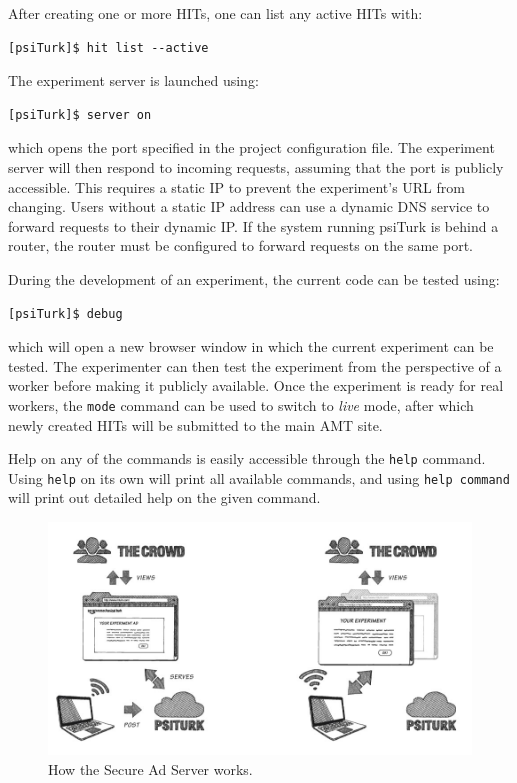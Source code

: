 \documentclass[twocolumn]{svjour3}          %
\newcommand{\psiturk}[0]{\textsf{psiTurk}}
\begin{document}
After creating one or more HITs, one can list any active HITs with:

\begin{lstlisting}
[psiTurk]$ hit list --active
\end{lstlisting}

The experiment server is launched using:

\begin{lstlisting}
[psiTurk]$ server on
\end{lstlisting}

\noindent which opens the port specified in the project configuration file.
The experiment server will then respond to incoming requests, assuming that the port is publicly accessible.
This requires a static IP to prevent the experiment's URL from changing.
Users without a static IP address can use a dynamic DNS service to forward requests to their dynamic IP.
If the system running \psiturk{} is behind a router, the router must be configured to forward requests on the same port.

During the development of an experiment, the current code can be tested using:

\begin{lstlisting}
[psiTurk]$ debug
\end{lstlisting}

\noindent which will open a new browser window in which the current experiment can be tested. The experimenter can then test the experiment from the perspective of a worker before making it publicly available.
Once the experiment is ready for real workers, the \texttt{mode} command can be used to switch to \emph{live} mode, after which newly created HITs will be submitted to the main AMT site.

Help on any of the commands is easily accessible through the \texttt{help} command. Using \texttt{help} on its own will print all available commands, and using \texttt{help command} will print out detailed help on the given command.

\begin{figure}[tp]
\centering
\includegraphics[scale=.40]{figures/psiturk_cloud_sequence.jpg}
\caption{How the Secure Ad Server works.}
\label{fig:adserver}
\end{figure}
\end{document}
